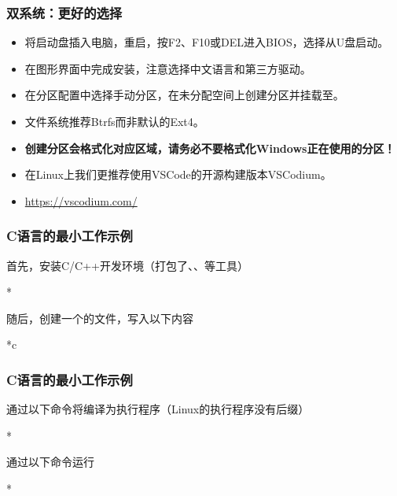 \begin{frame}
    \frametitle{双系统：更好的选择}
    \begin{itemize}
        \item 将启动盘插入电脑，重启，按F2、F10或DEL进入BIOS，选择从U盘启动。
        \item 在图形界面中完成安装，注意选择中文语言和第三方驱动。
        \item 在分区配置中选择手动分区，在未分配空间上创建分区并挂载至\code{/}。
        \item 文件系统推荐Btrfs而非默认的Ext4。
        \item \textbf{创建分区会格式化对应区域，请务必不要格式化Windows正在使用的分区！}
        \item 在Linux上我们更推荐使用VSCode的开源构建版本VSCodium。
        \item \url{https://vscodium.com/}
    \end{itemize}
\end{frame}

\begin{frame}
    \frametitle{C语言的最小工作示例}
    首先，安装C/C++开发环境（打包了、、等工具）
    \begin{Code}*
        
    \end{Code}
    随后，创建一个的文件，写入以下内容
    \begin{Code}*{c}
        
    \end{Code}
\end{frame}

\begin{frame}
    \frametitle{C语言的最小工作示例}
    通过以下命令将编译为执行程序（Linux的执行程序没有后缀）
    \begin{Code}*
        
    \end{Code}
    通过以下命令运行 
    \begin{Code}*
        
    \end{Code}
\end{frame}
